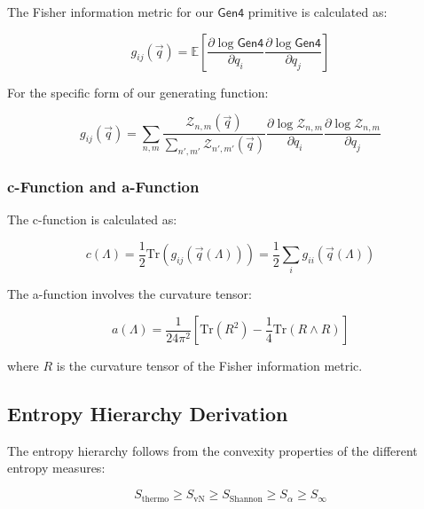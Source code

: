 The Fisher information metric for our $\mathsf{Gen4}$ primitive is calculated as:

\begin{equation}
g_{ij}(\vec{q}) = \mathbb{E}\left[ \frac{\partial \log \mathsf{Gen4}}{\partial q_i} \frac{\partial \log \mathsf{Gen4}}{\partial q_j} \right]
\label{eq:fisher-metric-calculation}
\end{equation}

For the specific form of our generating function:

\begin{equation}
g_{ij}(\vec{q}) = \sum_{n,m} \frac{\mathcal{Z}_{n,m}(\vec{q})}{\sum_{n',m'} \mathcal{Z}_{n',m'}(\vec{q})} \frac{\partial \log \mathcal{Z}_{n,m}}{\partial q_i} \frac{\partial \log \mathcal{Z}_{n,m}}{\partial q_j}
\label{eq:fisher-metric-explicit}
\end{equation}

\subsubsection{c-Function and a-Function}

The c-function is calculated as:

\begin{equation}
c(\Lambda) = \frac{1}{2} \text{Tr}(g_{ij}(\vec{q}(\Lambda))) = \frac{1}{2} \sum_i g_{ii}(\vec{q}(\Lambda))
\label{eq:c-function-calculation}
\end{equation}

The a-function involves the curvature tensor:

\begin{equation}
a(\Lambda) = \frac{1}{24\pi^2} \left[ \text{Tr}(R^2) - \frac{1}{4}\text{Tr}(R \wedge R) \right]
\label{eq:a-function-calculation}
\end{equation}

where $R$ is the curvature tensor of the Fisher information metric.

\subsection{Entropy Hierarchy Derivation}

The entropy hierarchy follows from the convexity properties of the different entropy measures:

\begin{equation}
S_{\text{thermo}} \geq S_{\text{vN}} \geq S_{\text{Shannon}} \geq S_{\alpha} \geq S_{\infty}
\label{eq:entropy-hierarchy-derivation}
\end{equation}

